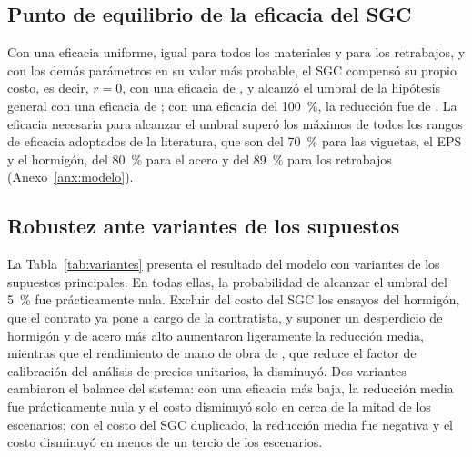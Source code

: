 \subsection{Punto de equilibrio de la eficacia del SGC}
\label{sec:res-equilibrio}

Con una eficacia uniforme, igual para todos los materiales y para los retrabajos, y con los demás parámetros en su valor más probable, el SGC compensó su propio costo, es decir, $r = 0$, con una eficacia de \KequilibrioCero{}, y alcanzó el umbral de la hipótesis general con una eficacia de \KequilibrioUmbral{}; con una eficacia del 100~\%, la reducción fue de \rMaxTeorico{}. La eficacia necesaria para alcanzar el umbral superó los máximos de todos los rangos de eficacia adoptados de la literatura, que son del 70~\% para las viguetas, el EPS y el hormigón, del 80~\% para el acero y del 89~\% para los retrabajos (Anexo~\ref{anx:modelo}).

\subsection{Robustez ante variantes de los supuestos}
\label{sec:res-variantes}

La Tabla~\ref{tab:variantes} presenta el resultado del modelo con variantes de los supuestos principales. En todas ellas, la probabilidad de alcanzar el umbral del 5~\% fue prácticamente nula. Excluir del costo del SGC los ensayos del hormigón, que el contrato ya pone a cargo de la contratista, y suponer un desperdicio de hormigón y de acero más alto aumentaron ligeramente la reducción media, mientras que el rendimiento de mano de obra de \textcite[p.~151]{alcon2009}, que reduce el factor de calibración del análisis de precios unitarios, la disminuyó. Dos variantes cambiaron el balance del sistema: con una eficacia más baja, la reducción media fue prácticamente nula y el costo disminuyó solo en cerca de la mitad de los escenarios; con el costo del SGC duplicado, la reducción media fue negativa y el costo disminuyó en menos de un tercio de los escenarios.

